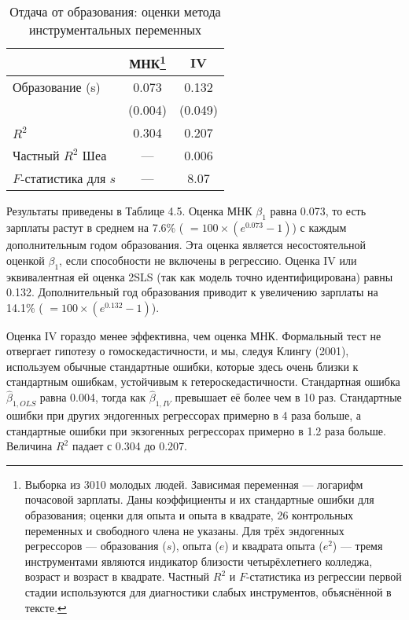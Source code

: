 \begin{table}[h]
\begin{minipage}{\textwidth}
\caption{  \label{tab:ivapp}Отдача от образования: оценки метода инструментальных переменных} 

    \begin{tabular}{lcc}
    \hline
	\hline
	& \bf{МНК}\footnote{Выборка из 3010 молодых людей. Зависимая переменная --- логарифм почасовой зарплаты. Даны коэффициенты и их стандартные ошибки для образования; оценки для опыта и опыта в квадрате, 26 контрольных переменных и свободного члена не указаны. Для трёх эндогенных регрессоров --- образования ($s$), опыта ($e$) и квадрата опыта ($e^2$) --- тремя инструментами являются индикатор близости четырёхлетнего колледжа, возраст и возраст в квадрате. Частный $R^2$ и $F$-статистика из регрессии первой стадии используются для диагностики слабых инструментов, объяснённой в тексте.} & \bf{IV} \\
	\hline
    Образование (s) & 0.073 & 0.132 \\
    	& (0.004) & (0.049) \\
    $R^2$	& 0.304 & 0.207 \\
    Частный $R^2$ Шеа & --- & 0.006 \\
    $F$-статистика для $s$ & --- & 8.07 \\
    \hline
	\hline
\end{tabular}
\end{minipage}
\end{table} 


Результаты приведены в Таблице 4.5. Оценка МНК $\beta_1$ равна 0.073, то есть зарплаты растут в среднем на 7.6\% ( $= 100 \times (e^{0.073}-1)$) с каждым дополнительным годом образования. Эта оценка является несостоятельной оценкой $\beta_1$, если способности не включены в регрессию. Оценка IV или эквивалентная ей оценка 2SLS (так как модель точно идентифицирована) равны 0.132. Дополнительный год образования приводит к увеличению зарплаты на 14.1\% ( $= 100 \times (e^{0.132}-1)$). 

Оценка IV  гораздо менее эффективна, чем оценка МНК. Формальный тест не отвергает гипотезу о гомоскедастичности, и мы, следуя Клингу (2001), используем обычные стандартные ошибки, которые здесь очень близки к стандартным ошибкам, устойчивым к гетероскедастичности. Стандартная ошибка $\hat{\beta}_{1, OLS}$ равна 0.004, тогда как $\hat{\beta}_{1, IV}$ превышает её более чем в 10 раз. Стандартные ошибки при других эндогенных регрессорах примерно в 4 раза больше, а стандартные ошибки при экзогенных регрессорах примерно в 1.2 раза больше. Величина $R^2$ падает с 0.304 до 0.207. 

